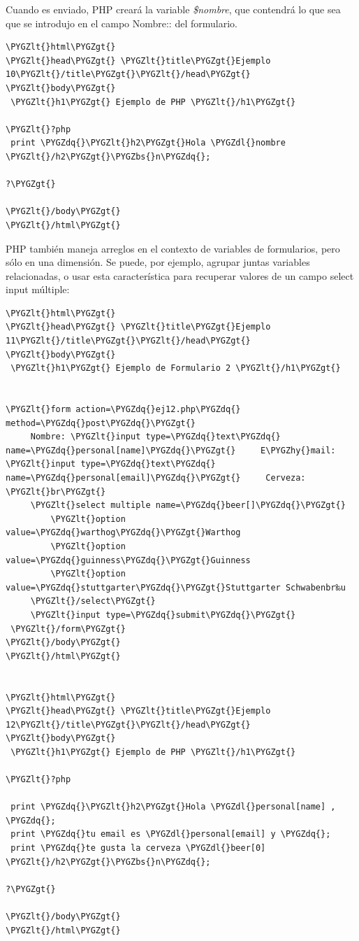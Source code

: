 \documentclass[a5paper,10pt,spanish]{sphinxmanual}
\def\PYGZbs{\char`\\}
\def\PYGZlt{\char`\<}
\def\PYGZgt{\char`\>}
\def\PYGZdl{\char`\$}
\def\PYGZhy{\char`\-}
\def\PYGZdq{\char`\"}
\begin{document}
Cuando es enviado, PHP creará la variable \emph{\$nombre}, que contendrá lo
que sea que se introdujo en el campo Nombre:: del formulario.

\begin{Verbatim}[commandchars=\\\{\}]
\PYGZlt{}html\PYGZgt{}
\PYGZlt{}head\PYGZgt{} \PYGZlt{}title\PYGZgt{}Ejemplo 10\PYGZlt{}/title\PYGZgt{}\PYGZlt{}/head\PYGZgt{}
\PYGZlt{}body\PYGZgt{}
 \PYGZlt{}h1\PYGZgt{} Ejemplo de PHP \PYGZlt{}/h1\PYGZgt{}

\PYGZlt{}?php
 print \PYGZdq{}\PYGZlt{}h2\PYGZgt{}Hola \PYGZdl{}nombre \PYGZlt{}/h2\PYGZgt{}\PYGZbs{}n\PYGZdq{};

?\PYGZgt{}

\PYGZlt{}/body\PYGZgt{}
\PYGZlt{}/html\PYGZgt{}
\end{Verbatim}

PHP también maneja arreglos en el contexto de variables de formularios,
pero sólo en una dimensión. Se puede, por ejemplo, agrupar juntas
variables relacionadas, o usar esta característica para recuperar
valores de un campo select input múltiple:

\begin{Verbatim}[commandchars=\\\{\}]
\PYGZlt{}html\PYGZgt{}
\PYGZlt{}head\PYGZgt{} \PYGZlt{}title\PYGZgt{}Ejemplo 11\PYGZlt{}/title\PYGZgt{}\PYGZlt{}/head\PYGZgt{}
\PYGZlt{}body\PYGZgt{}
 \PYGZlt{}h1\PYGZgt{} Ejemplo de Formulario 2 \PYGZlt{}/h1\PYGZgt{}


\PYGZlt{}form action=\PYGZdq{}ej12.php\PYGZdq{} method=\PYGZdq{}post\PYGZdq{}\PYGZgt{}
     Nombre: \PYGZlt{}input type=\PYGZdq{}text\PYGZdq{} name=\PYGZdq{}personal[name]\PYGZdq{}\PYGZgt{}     E\PYGZhy{}mail: \PYGZlt{}input type=\PYGZdq{}text\PYGZdq{} name=\PYGZdq{}personal[email]\PYGZdq{}\PYGZgt{}     Cerveza: \PYGZlt{}br\PYGZgt{}
     \PYGZlt{}select multiple name=\PYGZdq{}beer[]\PYGZdq{}\PYGZgt{}
         \PYGZlt{}option value=\PYGZdq{}warthog\PYGZdq{}\PYGZgt{}Warthog
         \PYGZlt{}option value=\PYGZdq{}guinness\PYGZdq{}\PYGZgt{}Guinness
         \PYGZlt{}option value=\PYGZdq{}stuttgarter\PYGZdq{}\PYGZgt{}Stuttgarter Schwabenbr‰u
     \PYGZlt{}/select\PYGZgt{}
     \PYGZlt{}input type=\PYGZdq{}submit\PYGZdq{}\PYGZgt{}
 \PYGZlt{}/form\PYGZgt{}
\PYGZlt{}/body\PYGZgt{}
\PYGZlt{}/html\PYGZgt{}


\PYGZlt{}html\PYGZgt{}
\PYGZlt{}head\PYGZgt{} \PYGZlt{}title\PYGZgt{}Ejemplo 12\PYGZlt{}/title\PYGZgt{}\PYGZlt{}/head\PYGZgt{}
\PYGZlt{}body\PYGZgt{}
 \PYGZlt{}h1\PYGZgt{} Ejemplo de PHP \PYGZlt{}/h1\PYGZgt{}

\PYGZlt{}?php

 print \PYGZdq{}\PYGZlt{}h2\PYGZgt{}Hola \PYGZdl{}personal[name] , \PYGZdq{};
 print \PYGZdq{}tu email es \PYGZdl{}personal[email] y \PYGZdq{};
 print \PYGZdq{}te gusta la cerveza \PYGZdl{}beer[0] \PYGZlt{}/h2\PYGZgt{}\PYGZbs{}n\PYGZdq{};

?\PYGZgt{}

\PYGZlt{}/body\PYGZgt{}
\PYGZlt{}/html\PYGZgt{}
\end{Verbatim}
\end{document}
